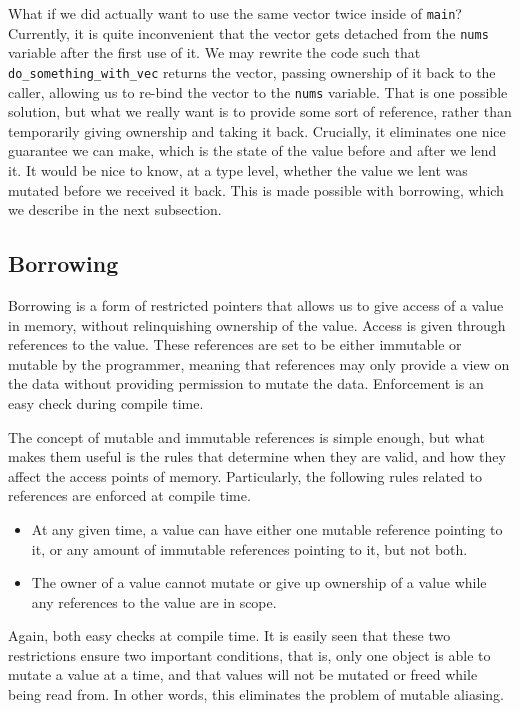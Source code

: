 \documentclass[letterpaper,11pt]{article}
\begin{document}
What if we did actually want to use the same vector twice inside of \texttt{main}?
Currently, it is quite inconvenient that the vector gets detached from the \texttt{nums}
variable after the first use of it. We may rewrite the code such that
\texttt{do\_something\_with\_vec} returns the vector, passing ownership of it back
to the caller, allowing us to re-bind the vector to the \texttt{nums} variable.
That is one possible solution, but what we really want is to provide some sort
of reference, rather than temporarily giving ownership and taking it back.
Crucially, it eliminates one nice guarantee we can make, which is the state
of the value before and after we lend it. It would be nice to know, at a type level,
whether the value we lent was mutated before we received it back. This is made
possible with borrowing, which we describe in the next subsection.

\subsection{Borrowing}
Borrowing is a form of restricted pointers that allows us to give access of a value
in memory, without relinquishing ownership of the value. Access is given through
references to the value. These references are set to be either immutable or mutable
by the programmer, meaning that references may only provide a view on the data
without providing permission to mutate the data. Enforcement is an easy check during
compile time.

The concept of mutable and immutable references is simple enough, but what makes them
useful is the rules that determine when they are valid, and how they affect the
access points of memory. Particularly, the following rules related to references
are enforced at compile time.
\begin{itemize}
    \item At any given time, a value can have either one mutable reference pointing to it, or any amount of immutable references pointing to it, but not both.
    \item The owner of a value cannot mutate or give up ownership of a value while any references to the value are in scope.
\end{itemize}
Again, both easy checks at compile time. It is easily seen that these two restrictions
ensure two important conditions, that is, only one object is able to mutate a value
at a time, and that values will not be mutated or freed while being read from. In
other words, this eliminates the problem of mutable aliasing.
\end{document}
